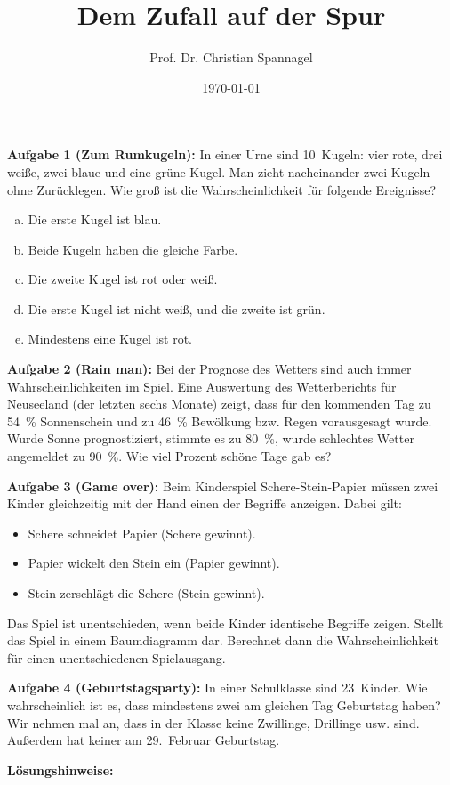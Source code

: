 \documentclass{cssheet}
\title{Dem Zufall auf der Spur}
\author{Prof. Dr. Christian Spannagel}
\date{\today}
\begin{document}
\printtitle

\vspace*{10mm}

\textbf{Aufgabe 1 (Zum Rumkugeln):}  In einer Urne sind 10~Kugeln:  vier	rote, drei weiße, zwei blaue und eine grüne Kugel. Man zieht nacheinander zwei Kugeln ohne Zurücklegen. Wie groß ist die Wahrscheinlichkeit für folgende Ereignisse?

\begin{enumerate}[a)]
\item Die erste Kugel ist blau.
\item Beide Kugeln haben die gleiche Farbe.
\item Die zweite Kugel ist rot oder weiß.
\item Die erste Kugel ist nicht weiß, und die zweite ist grün.
\item Mindestens eine Kugel ist rot.
\end{enumerate}


\textbf{Aufgabe 2 (Rain man):} Bei der Prognose des Wetters sind auch immer Wahrscheinlichkeiten im Spiel. Eine Auswertung des Wetterberichts für Neuseeland (der letzten sechs Monate) zeigt, dass für den kommenden Tag zu 54~\% Sonnenschein und zu 46~\% Bewölkung bzw. Regen vorausgesagt wurde. Wurde Sonne prognostiziert, stimmte es zu 80~\%, wurde schlechtes Wetter angemeldet zu 90~\%. Wie viel Prozent schöne Tage gab es?	 

\textbf{Aufgabe 3 (Game over):} Beim Kinderspiel \glqq{}Schere-Stein-Papier\grqq{} müssen zwei Kinder gleichzeitig mit der Hand einen der Begriffe anzeigen. Dabei gilt:
\begin{itemize}
\item Schere schneidet Papier (Schere gewinnt).
\item Papier wickelt den Stein ein (Papier gewinnt).
\item Stein zerschlägt die Schere (Stein gewinnt).
\end{itemize}
Das Spiel ist unentschieden, wenn beide Kinder identische Begriffe zeigen. Stellt das Spiel in einem Baumdiagramm dar. Berechnet dann die Wahrscheinlichkeit für einen unentschiedenen Spielausgang.

\textbf{Aufgabe 4 (Geburtstagsparty):} In einer Schulklasse sind 23~Kinder. Wie wahrscheinlich ist es, dass mindestens zwei am gleichen Tag Geburtstag haben? Wir nehmen mal an, dass in der Klasse keine Zwillinge, Drillinge usw. sind. Außerdem hat keiner am 29.~Februar Geburtstag.  

\newpage
\textbf{Lösungshinweise:} 
\end{document}
